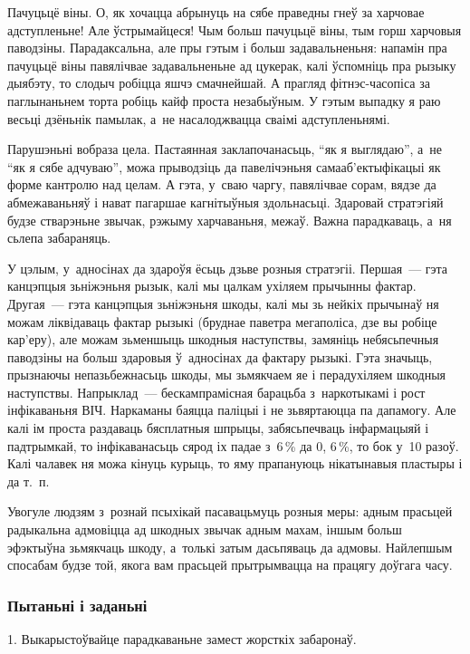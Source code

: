 Пачуцьцё віны. О, як хочацца абрынуць на сябе праведны гнеў за харчовае адступленьне! Але ўстрымайцеся! Чым больш пачуцьцё віны, тым горш харчовыя паводзіны. Парадаксальна, але пры гэтым і больш задавальненьня: напамін пра пачуцьцё віны павялічвае задавальненьне ад цукерак, калі ўспомніць пра рызыку дыябэту, то слодыч робіцца яшчэ смачнейшай. А прагляд фітнэс-часопіса за паглынаньнем торта робіць кайф проста незабыўным. У гэтым выпадку я раю весьці дзёньнік памылак, а~не насалоджвацца сваімі адступленьнямі.

Парушэньні вобраза цела. Пастаянная заклапочанасьць, ``як я выглядаю'', а~не ``як я сябе адчуваю'', можа прыводзіць да павелічэньня самааб'ектыфікацыі як форме кантролю над целам. А гэта, у~сваю чаргу, павялічвае сорам, вядзе да абмежаваньняў і нават пагаршае кагнітыўныя здольнасьці. Здаровай стратэгіяй будзе стварэньне звычак, рэжыму харчаваньня, межаў. Важна парадкаваць, а~ня сьлепа забараняць.

У цэлым, у~адносінах да здароўя ёсьць дзьве розныя стратэгіі. Першая~--- гэта канцэпцыя зьніжэньня рызык, калі мы цалкам ухіляем прычынны фактар. Другая~--- гэта канцэпцыя зьніжэньня шкоды, калі мы зь нейкіх прычынаў ня можам ліквідаваць фактар рызыкі (бруднае паветра мегаполіса, дзе вы робіце кар'еру), але можам зьменшыць шкодныя наступствы, замяніць небясьпечныя паводзіны на больш здаровыя ў~адносінах да фактару рызыкі. Гэта значыць, прызнаючы непазьбежнасьць шкоды, мы зьмякчаем яе і перадухіляем шкодныя наступствы. Напрыклад~--- бескампрамісная барацьба з~наркотыкамі і рост інфікаваньня ВІЧ. Наркаманы баяцца паліцыі і не зьвяртаюцца па дапамогу. Але калі ім проста раздаваць бясплатныя шпрыцы, забясьпечваць інфармацыяй і падтрымкай, то інфікаванасьць сярод іх падае з~6\,\% да 0, 6\,\%, то бок у~10 разоў. Калі чалавек ня можа кінуць курыць, то яму прапануюць нікатынавыя пластыры і да т.~п.

Увогуле людзям з~рознай псыхікай пасавацьмуць розныя меры: адным прасьцей радыкальна адмовіцца ад шкодных звычак адным махам, іншым больш эфэктыўна зьмякчаць шкоду, а~толькі затым дасьпяваць да адмовы. Найлепшым спосабам будзе той, якога вам прасьцей прытрымвацца на працягу доўгага часу.

\subsubsection{Пытаньні і заданьні}

1. Выкарыстоўвайце парадкаваньне замест жорсткіх забаронаў.

